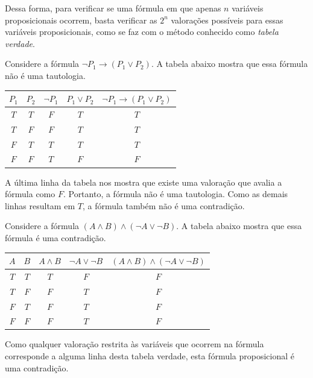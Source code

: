 Dessa forma, para verificar se uma fórmula em que apenas $n$ variáveis proposicionais ocorrem, basta verificar as $2^n$ valorações possíveis para essas variáveis proposicionais, como se faz com o método conhecido como \emph{tabela verdade}.

\begin{example}\label{exa:formulaNaoTautologica}
    Considere a fórmula $\neg P_1 \rightarrow (P_1 \vee P_2)$.
    A tabela abaixo mostra que essa fórmula não é uma tautologia.

    \begin{center}
        \begin{tabular}{c|c|c|c|c}
            $P_1$ & $P_2$ & $\neg P_1$ & $P_1 \vee P_2$ & $\neg P_1 \rightarrow (P_1 \vee P_2)$ \\
            \hline
            $T$ & $T$ & $F$ & $T$ & $T$ \\
            $T$ & $F$ & $F$ & $T$ & $T$ \\
            $F$ & $T$ & $T$ & $T$ & $T$ \\
            $F$ & $F$ & $T$ & $F$ & $F$
        \end{tabular}
    \end{center}

    A última linha da tabela nos mostra que existe uma valoração que avalia a fórmula como $F$.
    Portanto, a fórmula não é uma tautologia.
    Como as demais linhas resultam em $T$, a fórmula também não é uma contradição.
\end{example}

\begin{example}\label{exa:contradicaoPorTabelaVerdade}
    Considere a fórmula $(A\wedge B) \wedge (\neg A \vee \neg B)$.
    A tabela abaixo mostra que essa fórmula é uma contradição.

    \begin{center}
        \begin{tabular}{c|c|c|c|c}
            $A$ & $B$ & $A\wedge B$ & $\neg A \vee \neg B$ & $(A\wedge B) \wedge (\neg A \vee \neg B)$ \\
            \hline
            $T$ & $T$ & $T$ & $F$ & $F$ \\
            $T$ & $F$ & $F$ & $T$ & $F$ \\
            $F$ & $T$ & $F$ & $T$ & $F$ \\
            $F$ & $F$ & $F$ & $T$ & $F$
        \end{tabular}
    \end{center}

Como qualquer valoração restrita às variáveis que ocorrem na fórmula corresponde a alguma linha desta tabela verdade, esta fórmula proposicional é uma contradição.
\end{example}

